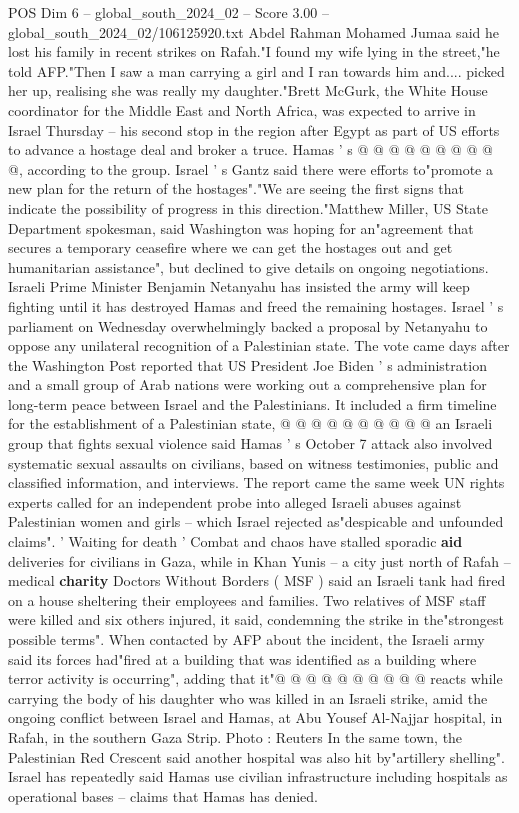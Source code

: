 \begin{textsample}{POS Dim 6 – global\_south\_2024\_02 – Score 3.00 – global\_south\_2024\_02/106125920.txt}
Abdel Rahman Mohamed Jumaa said he lost his family in recent strikes on Rafah."I found my wife lying in the street,"he told AFP."Then I saw a man carrying a girl and I ran towards him and.... picked her up, realising she was really my daughter."Brett McGurk, the White House coordinator for the Middle East and North Africa, was expected to arrive in Israel Thursday -- his second stop in the region after Egypt as part of US efforts to advance a hostage deal and broker a truce.
Hamas ' s @ @ @ @ @ @ @ @ @ @, according to the group.
Israel ' s Gantz said there were efforts to"promote a new plan for the return of the hostages"."We are seeing the first signs that indicate the possibility of progress in this direction."Matthew Miller, US State Department spokesman, said Washington was hoping for an"agreement that secures a temporary ceasefire where we can get the hostages out and get humanitarian assistance", but declined to give details on ongoing negotiations.
Israeli Prime Minister Benjamin Netanyahu has insisted the army will keep fighting until it has destroyed Hamas and freed the remaining hostages.
Israel ' s parliament on Wednesday overwhelmingly backed a proposal by Netanyahu to oppose any unilateral recognition of a Palestinian state.
The vote came days after the Washington Post reported that US President Joe Biden ' s administration and a small group of Arab nations were working out a comprehensive plan for long-term peace between Israel and the Palestinians.
It included a firm timeline for the establishment of a Palestinian state, @ @ @ @ @ @ @ @ @ @ an Israeli group that fights sexual violence said Hamas ' s October 7 attack also involved systematic sexual assaults on civilians, based on witness testimonies, public and classified information, and interviews.
The report came the same week UN rights experts called for an independent probe into alleged Israeli abuses against Palestinian women and girls -- which Israel rejected as"despicable and unfounded claims". ' Waiting for death ' Combat and chaos have stalled sporadic \textbf{aid} deliveries for civilians in Gaza, while in Khan Yunis -- a city just north of Rafah -- medical \textbf{charity} Doctors Without Borders ( MSF ) said an Israeli tank had fired on a house sheltering their employees and families.
Two relatives of MSF staff were killed and six others injured, it said, condemning the strike in the"strongest possible terms".
When contacted by AFP about the incident, the Israeli army said its forces had"fired at a building that was identified as a building where terror activity is occurring", adding that it"@ @ @ @ @ @ @ @ @ @ reacts while carrying the body of his daughter who was killed in an Israeli strike, amid the ongoing conflict between Israel and Hamas, at Abu Yousef Al-Najjar hospital, in Rafah, in the southern Gaza Strip.
Photo : Reuters In the same town, the Palestinian Red Crescent said another hospital was also hit by"artillery shelling".
Israel has repeatedly said Hamas use civilian infrastructure including hospitals as operational bases -- claims that Hamas has denied.

\end{textsample}
